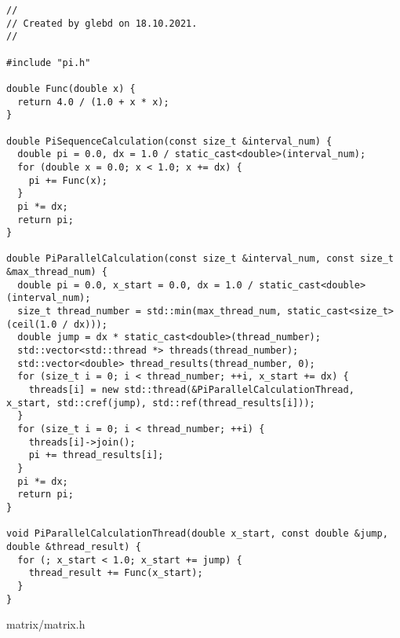 \documentclass{report}
\begin{document}
\begin{lstlisting}
//
// Created by glebd on 18.10.2021.
//

#include "pi.h"

double Func(double x) {
  return 4.0 / (1.0 + x * x);
}

double PiSequenceCalculation(const size_t &interval_num) {
  double pi = 0.0, dx = 1.0 / static_cast<double>(interval_num);
  for (double x = 0.0; x < 1.0; x += dx) {
    pi += Func(x);
  }
  pi *= dx;
  return pi;
}

double PiParallelCalculation(const size_t &interval_num, const size_t &max_thread_num) {
  double pi = 0.0, x_start = 0.0, dx = 1.0 / static_cast<double>(interval_num);
  size_t thread_number = std::min(max_thread_num, static_cast<size_t>(ceil(1.0 / dx)));
  double jump = dx * static_cast<double>(thread_number);
  std::vector<std::thread *> threads(thread_number);
  std::vector<double> thread_results(thread_number, 0);
  for (size_t i = 0; i < thread_number; ++i, x_start += dx) {
    threads[i] = new std::thread(&PiParallelCalculationThread, x_start, std::cref(jump), std::ref(thread_results[i]));
  }
  for (size_t i = 0; i < thread_number; ++i) {
    threads[i]->join();
    pi += thread_results[i];
  }
  pi *= dx;
  return pi;
}

void PiParallelCalculationThread(double x_start, const double &jump, double &thread_result) {
  for (; x_start < 1.0; x_start += jump) {
    thread_result += Func(x_start);
  }
}  
\end{lstlisting}
matrix/matrix.h
\end{document}
